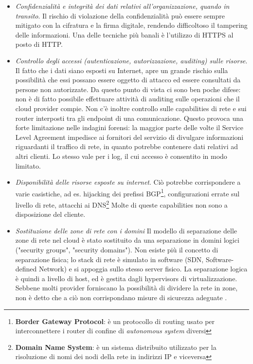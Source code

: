 \documentclass[../main.tex]{subfiles}
\begin{document}
\begin{itemize}
\item \textit{Confidenzialità e integrità dei dati relativi all'organizzazione, quando in transito}.
Il rischio di violazione della confidenzialità può essere sempre mitigato con la cifratura e la firma digitale, rendendo difficoltoso il tampering delle informazioni. Una delle tecniche più banali è l'utilizzo di HTTPS al posto di HTTP.
\item \textit{Controllo degli accessi (autenticazione, autorizzazione, auditing) sulle risorse}. Il fatto che i dati siano esposti su Internet, apre un grande rischio sulla possibilità che essi possano essere oggetto di attacco ed essere consultati da persone non autorizzate. Da questo punto di vista ci sono ben poche difese: non è di fatto possibile effettuare attività di auditing sulle operazioni che il cloud provider compie. Non c'è inoltre controllo sulle capabilities di rete e sui router interposti tra gli endpoint di una comunicazione.
Questo provoca una forte limitazione nelle indagini forensi: la maggior parte delle volte il Service Level Agreement impedisce ai fornitori del servizio di divulgare informazioni riguardanti il traffico di rete, in quanto potrebbe contenere dati relativi ad altri clienti. Lo stesso vale per i log, il cui accesso è consentito in modo limitato.
\item \textit{Disponibilità delle risorse esposte su internet}. Ciò potrebbe corrispondere a varie casistiche, ad es. hijacking dei prefissi BGP\footnote{\textbf{Border Gateway Protocol}: è un protocollo di routing usato per interconnettere i router di confine di \textit{autonomous system} diversi}, configurazioni errate sul livello di rete, attacchi ai DNS\footnote{\textbf{Domain Name System}: è un sistema distribuito utilizzato per la risoluzione di nomi dei nodi della rete in indirizzi IP e viceversa} Molte di queste capabilities non sono a disposizione del cliente.
\item \textit{Sostituzione delle zone di rete con i domini}
Il modello di separazione delle zone di rete nel cloud è stato sostituito da una separazione in domini logici ("security groups", "security domains"). Non esiste più il concetto di separazione fisica; lo stack di rete è simulato in software (SDN, Software-defined Network) e si appoggia sullo stesso server fisico. La separazione logica è quindi a livello di host, ed è gestita dagli hypervisors di virtualizzazione.
Sebbene molti provider forniscano la possibilità di dividere la rete in zone, non è detto che a ciò non corrispondano misure di sicurezza adeguate \cite{CloudSecurityBook}.
\end{itemize}
\end{document}
